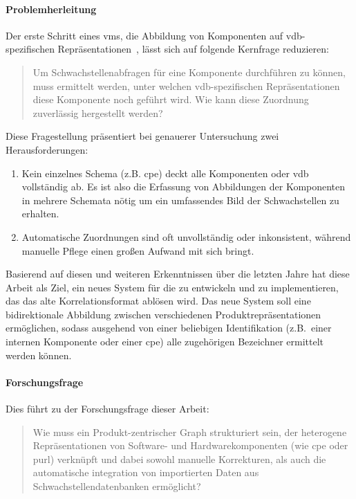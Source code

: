 \paragraph{Problemherleitung}

Der erste Schritt eines \acrshort{vms}, die Abbildung von Komponenten auf \acrshort{vdb}-spezifischen Repräsentationen\ \autocite{Idrissi_Sebai_Faroukhi_Mahouachi_2024}, lässt sich auf folgende Kernfrage reduzieren:

\begin{quote}
    Um Schwachstellenabfragen für eine Komponente durchführen zu können, muss ermittelt werden, unter welchen \acrshort{vdb}-spezifischen Repräsentationen diese Komponente noch geführt wird.
    Wie kann diese Zuordnung zuverlässig hergestellt werden?
\end{quote}

Diese Fragestellung präsentiert bei genauerer Untersuchung zwei Herausforderungen:

\begin{enumerate}
    \item Kein einzelnes Schema (z.B. \acrshort{cpe}) deckt alle Komponenten oder \acrshort{vdb} vollständig ab.
    Es ist also die Erfassung von Abbildungen der Komponenten in mehrere Schemata nötig um ein umfassendes Bild der Schwachstellen zu erhalten.
    \item Automatische Zuordnungen sind oft unvollständig oder inkonsistent, während manuelle Pflege einen großen Aufwand mit sich bringt.
\end{enumerate}

Basierend auf diesen und weiteren Erkenntnissen über die letzten Jahre hat diese Arbeit als Ziel, ein neues System für die \metaeffektsp zu entwickeln und zu implementieren, das das alte Korrelationsformat ablösen wird.
Das neue System soll eine bidirektionale Abbildung zwischen verschiedenen Produktrepräsentationen ermöglichen, sodass ausgehend von einer beliebigen Identifikation (z.B.\ einer internen Komponente oder einer \acrshort{cpe}) alle zugehörigen Bezeichner ermittelt werden können.

\paragraph{Forschungsfrage}

Dies führt zu der Forschungsfrage dieser Arbeit:

\begin{quote}
    Wie muss ein Produkt-zentrischer Graph strukturiert sein, der heterogene Repräsentationen von Software- und Hardwarekomponenten (wie \acrfull{cpe} oder \acrfull{purl}) verknüpft und
    dabei sowohl manuelle Korrekturen, als auch die automatische integration von importierten Daten aus Schwachstellendatenbanken ermöglicht?
\end{quote}


